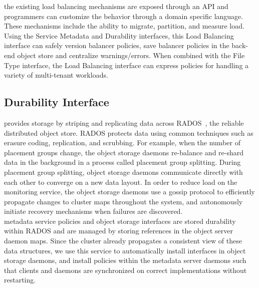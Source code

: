 the existing load balancing mechanisms
are exposed through an API and programmers can customize the behavior through a
domain specific language. These mechanisms include the ability to migrate,
partition, and measure load. Using the Service Metadata and Durability
interfaces, this Load Balancing interface can safely version balancer policies,
save balancer policies in the back-end object store and centralize
warnings/errors. When combined with the File Type interface, the Load Balancing
interface can express policies for handling a variety of multi-tenant
workloads.

 

\subsection{Durability Interface}
\label{sec:durability}


 provides storage
by striping and replicating data across RADOS~\cite{weil_rados_2007}, the
reliable distributed object store. RADOS protects data using common techniques
such as erasure coding, replication, and scrubbing. For example, when the number
of placement groups change, the object storage daemons re-balance and re-shard data in the
background in a process called placement group splitting. During placement group splitting, object storage daemons
communicate directly with each other to converge on a new data layout.  In order to reduce
load on the monitoring service, the object storage daemons use a gossip protocol to efficiently
propagate changes to cluster maps throughout the system, and autonomously
initiate recovery mechanisms when failures are discovered.\\

 metadata service policies and object
storage interfaces are stored durability within RADOS and are managed by storing
references in the object server daemon maps. Since the cluster already propagates a
consistent view of these data structures, we use this service to automatically
install interfaces in object storage daemons, and install policies within the metadata server
daemons such that clients and daemons are synchronized on
correct implementations without restarting.

 
